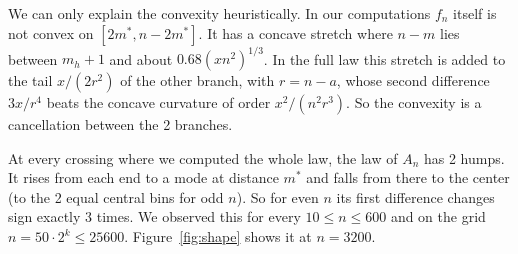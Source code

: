 We can only explain the convexity heuristically. In our computations $f_n$
itself is not convex on $[2m^*,n-2m^*]$. It has a concave stretch where
$n-m$ lies between $m_h+1$ and about $0.68(xn^2)^{1/3}$. In the full law
this stretch is added to the tail $x/(2r^2)$ of the other branch,
with $r=n-a$, whose second difference $3x/r^4$ beats the concave curvature
of order $x^2/(n^2r^3)$. So the convexity is a cancellation between the 2
branches.

At every crossing where we computed the whole law, the law of $A_n$ has 2
humps. It rises from each end to a mode at distance $m^*$ and falls from
there to the center (to the 2 equal central bins for odd $n$). So for even
$n$ its first difference changes sign exactly 3 times. We observed this for
every $10\le n\le600$ and on the grid $n=50\cdot2^k\le25600$.
Figure~\ref{fig:shape} shows it at $n=3200$.
